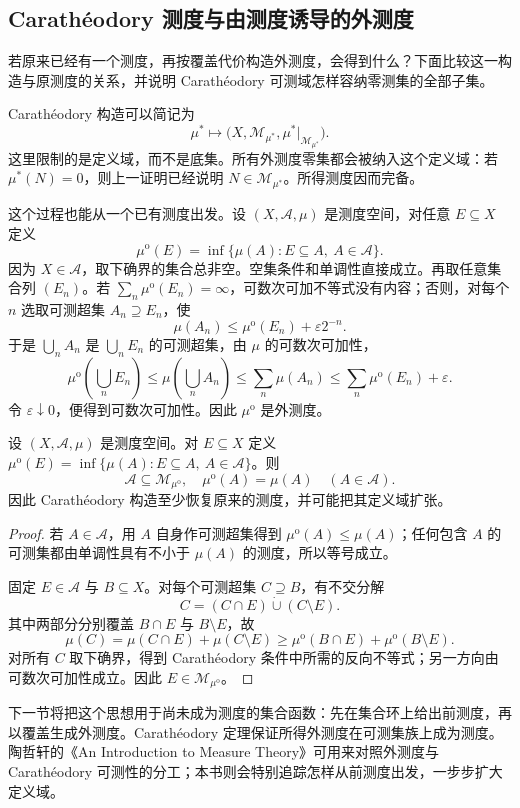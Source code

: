 \subsection{Carathéodory 测度与由测度诱导的外测度}
\label{b1:subsec:020304}

若原来已经有一个测度，再按覆盖代价构造外测度，会得到什么？下面比较这一构造与原测度的关系，并说明 Carathéodory 可测域怎样容纳零测集的全部子集。

\ProseParagraphBreak

Carathéodory 构造可以简记为
\[
\mu^*
\longmapsto
\bigl(X,\mathcal M_{\mu^*},\mu^*|_{\mathcal M_{\mu^*}}\bigr).
\]
这里限制的是定义域，而不是底集。所有外测度零集都会被纳入这个定义域：若 \(\mu^*(N)=0\)，则上一证明已经说明 \(N\in\mathcal M_{\mu^*}\)。所得测度因而完备。

\ProseParagraphBreak

这个过程也能从一个已有测度出发。设 \((X,\mathcal A,\mu)\) 是测度空间，对任意 \(E\subseteq X\) 定义
\[
\mu^{\mathrm o}(E)
=\inf\{\mu(A):E\subseteq A,\ A\in\mathcal A\}.
\]
因为 \(X\in\mathcal A\)，取下确界的集合总非空。空集条件和单调性直接成立。再取任意集合列 \((E_n)\)。若 \(\sum_n\mu^{\mathrm o}(E_n)=\infty\)，可数次可加不等式没有内容；否则，对每个 \(n\) 选取可测超集 \(A_n\supseteq E_n\)，使
\[
\mu(A_n)\leq\mu^{\mathrm o}(E_n)+\varepsilon2^{-n}.
\]
于是 \(\bigcup_nA_n\) 是 \(\bigcup_nE_n\) 的可测超集，由 \(\mu\) 的可数次可加性，
\[
\mu^{\mathrm o}\left(\bigcup_nE_n\right)
\leq\mu\left(\bigcup_nA_n\right)
\leq\sum_n\mu(A_n)
\leq\sum_n\mu^{\mathrm o}(E_n)+\varepsilon.
\]
令 \(\varepsilon\downarrow0\)，便得到可数次可加性。因此 \(\mu^{\mathrm o}\) 是外测度。

\begin{proposition}
\label{b1:prop:measure-induced-outer}
设 \((X,\mathcal A,\mu)\) 是测度空间。对 \(E\subseteq X\) 定义 \(\mu^{\mathrm o}(E)=\inf\{\mu(A):E\subseteq A,\ A\in\mathcal A\}\)。则
\[
\mathcal A\subseteq\mathcal M_{\mu^{\mathrm o}},
\quad
\mu^{\mathrm o}(A)=\mu(A)\quad(A\in\mathcal A).
\]
因此 Carathéodory 构造至少恢复原来的测度，并可能把其定义域扩张。
\end{proposition}
\begin{proof}
若 \(A\in\mathcal A\)，用 \(A\) 自身作可测超集得到 \(\mu^{\mathrm o}(A)\leq\mu(A)\)；任何包含 \(A\) 的可测集都由单调性具有不小于 \(\mu(A)\) 的测度，所以等号成立。

固定 \(E\in\mathcal A\) 与 \(B\subseteq X\)。对每个可测超集 \(C\supseteq B\)，有不交分解
\[
C=(C\cap E)\mathbin{\dot\cup}(C\setminus E).
\]
其中两部分分别覆盖 \(B\cap E\) 与 \(B\setminus E\)，故
\[
\mu(C)
=\mu(C\cap E)+\mu(C\setminus E)
\geq\mu^{\mathrm o}(B\cap E)+\mu^{\mathrm o}(B\setminus E).
\]
对所有 \(C\) 取下确界，得到 Carathéodory 条件中所需的反向不等式；另一方向由可数次可加性成立。因此 \(E\in\mathcal M_{\mu^{\mathrm o}}\)。
\end{proof}

下一节将把这个思想用于尚未成为测度的集合函数：先在集合环上给出前测度，再以覆盖生成外测度。Carathéodory 定理保证所得外测度在可测集族上成为测度。陶哲轩的《An Introduction to Measure Theory》\cite{Tao2011Introduction}可用来对照外测度与 Carathéodory 可测性的分工；本书则会特别追踪怎样从前测度出发，一步步扩大定义域。
